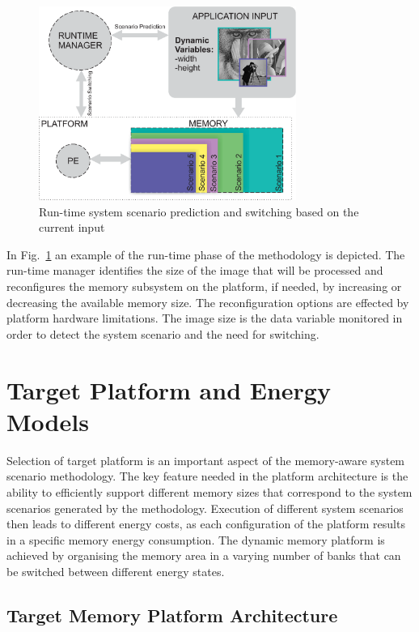 \documentclass[smallcondensed]{svjour3}
\begin{document}
\begin{figure}
\centering
\includegraphics[width=0.75\textwidth]{Images/switching.eps}
\caption{Run-time system scenario prediction and switching based on the current input}
\label{fig:runtime}
\end{figure}

In Fig.~\ref{fig:runtime} an example of the run-time phase of the methodology is depicted. 
The run-time manager identifies the size of the image that will be processed and reconfigures the memory subsystem on the platform, if needed, by increasing or decreasing the available memory size. 
The reconfiguration options are effected by platform hardware limitations. 
The image size is the data variable monitored in order to detect the system scenario and the need for switching.

\section{Target Platform and Energy Models}
\label{sec:platform}

Selection of target platform is an important aspect of the memory-aware system scenario methodology. 
The key feature needed in the platform architecture is the ability to efficiently support different memory sizes that correspond to the system scenarios generated by the methodology. 
Execution of different system scenarios then leads to different energy costs, as each configuration of the platform results in a specific memory energy consumption. 
The dynamic memory platform is achieved by organising the memory area in a varying number of banks that can be switched between different energy states. 

\subsection{Target Memory Platform Architecture}
\end{document}
